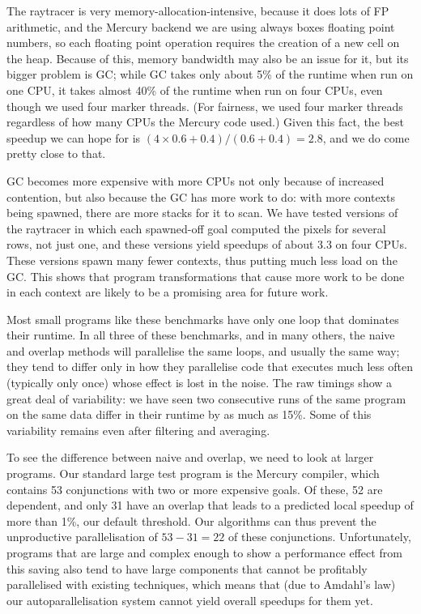 The raytracer is very memory-allocation-intensive,
because it does lots of FP arithmetic,
and the Mercury backend we are using always boxes floating point numbers,
so each floating point operation requires
the creation of a new cell on the heap.
Because of this, memory bandwidth may also be an issue for it,
but its bigger problem is GC;
while GC takes only about 5\% of the runtime when run on one CPU,
it takes almost 40\% of the runtime when run on four CPUs,
even though we used four marker threads.
(For fairness, we used four marker threads
regardless of how many CPUs the Mercury code used.)
Given this fact, the best speedup we can hope for is
$(4 \times 0.6 + 0.4)/(0.6 + 0.4) = 2.8$,
and we do come pretty close to that.

GC becomes more expensive with more CPUs
not only because of increased contention,
but also because the GC has more work to do:
with more contexts being spawned, there are more stacks for it to scan.
We have tested versions of the raytracer in which
each spawned-off goal computed the pixels for several rows, not just one,
and these versions yield speedups of about 3.3 on four CPUs.
These versions spawn many fewer contexts, thus putting much less load
on the GC.
This shows that
program transformations that cause more work to be done in each context
are likely to be a promising area for future work.

Most small programs like these benchmarks
have only one loop that dominates their runtime.
In all three of these benchmarks, and in many others,
the naive and overlap methods will parallelise the same loops,
and usually the same way;
they tend to differ only in how they parallelise code
that executes much less often (typically only once)
whose effect is lost in the noise.
The raw timings show a great deal of variability:
we have seen two consecutive runs of the same program on the same data
differ in their runtime by as much as 15\%.
Some of this variability remains even after filtering and averaging.

To see the difference between naive and overlap,
we need to look at larger programs.
Our standard large test program is the Mercury compiler, which contains
53 conjunctions with two or more expensive goals.
Of these, 52 are dependent,
and only 31 have an overlap
that leads to a predicted local speedup of more than 1\%,
our default threshold.
Our algorithms can thus prevent
the unproductive parallelisation of $53-31=22$ of these conjunctions.
Unfortunately, programs that are large and complex enough
to show a performance effect from this saving
also tend to have large components
that cannot be profitably parallelised with existing techniques,
which means that (due to Amdahl's law)
our autoparallelisation system cannot yield overall speedups for them yet.

